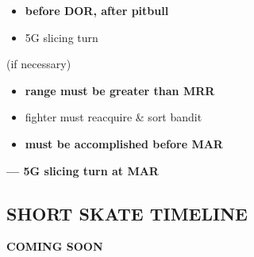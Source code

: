 \begin{checklistenumerate}[start=0]
    \blueitem[Out]
    \label{subsec:ttpaa:timeline:skate:out}
    \begin{itemize}
        \item \textbf{before DOR, after pitbull}
        \item 5G slicing turn
    \end{itemize}
    \blueitem[Recommit] (if necessary)
    \label{subsec:ttpaa:timeline:skate:recommit}
    \begin{itemize}
        \item \textbf{range must be greater than MRR}
        \item fighter must reacquire \& sort bandit
    \end{itemize}
    \blueitem[Employment]
    \label{subsec:ttpaa:timeline:skate:shoot2}
    \begin{itemize}
        \item \textbf{must be accomplished before MAR}
    \end{itemize}
    \blueitem[Out]%
    \label{subsec:ttpaa:timeline:skate:out2}
    \textbf{--- 5G slicing turn at MAR}
\end{checklistenumerate}

\clearpage

\subsection{SHORT SKATE TIMELINE}
\label{subsec:ttpaa:timeline:shortskate}

\begin{center}
    \vspace{\textheight/4}
    \Large\titlefont\textbf{COMING SOON}
\end{center}

\marginfigrestore
